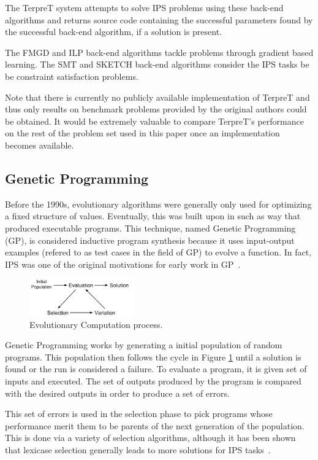 The TerpreT system attempts to solve IPS problems using these back-end algorithms and returns source code containing the successful parameters found by the successful back-end algorithm, if a solution is present.

The FMGD and ILP back-end algorithms tackle problems through gradient based learning. The SMT and SKETCH back-end algorithms consider the IPS tasks be be  constraint satisfaction problems.

Note that there is currently no publicly available implementation of TerpreT and thus only results on benchmark problems provided by the original authors could be obtained. It would be extremely valuable to compare TerpreT's performance on the rest of the problem set used in this paper once an implementation becomes available.

\subsection{Genetic Programming}

Before the 1990s, evolutionary algorithms were generally only used for optimizing a fixed structure of values. Eventually, this was built upon in such as way that produced executable programs. This technique, named Genetic Programming (GP), is considered inductive program synthesis because it uses input-output examples (refered to as test cases in the field of GP) to evolve a function. In fact, IPS was one of the original motivations for early work in GP~\cite{Koza1992}.

\begin{figure}[t]
\centering
\includegraphics[width=0.4\textwidth]{res/EvolutionCycle}
\caption{Evolutionary Computation process.}
\label{fig:evo}
\end{figure}

Genetic Programming works by generating a initial population of random programs.  This population then follows the cycle in Figure \ref{fig:evo} until a solution is found or the run is considered a failure. To evaluate a program, it is given set of inputs and executed. The set of outputs produced by the program is compared with the desired outputs in order to produce a set of errors.

This set of errors is used in the selection phase to pick programs whose performance merit them to be parents of the next generation of the population. This is done via a variety of selection algorithms, although it has been shown that lexicase selection generally leads to more solutions for IPS tasks~\cite{Helmuth2015a, Helmuth2015c, Forstenlechner:2017:eurogp}.

